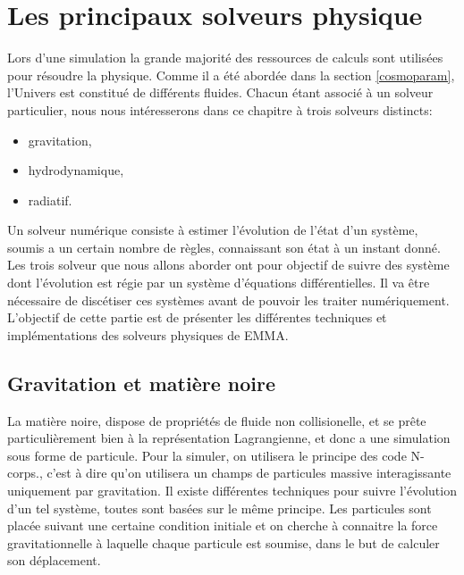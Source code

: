 \chapter{Les principaux solveurs physique}
\label{sec:solvers}

Lors d'une simulation la grande majorité des ressources de calculs sont utilisées pour résoudre la physique.
Comme il a été abordée dans la section \ref{cosmoparam}, l'Univers est constitué de différents fluides.
Chacun étant associé à un solveur particulier, nous nous intéresserons dans ce chapitre à trois solveurs distincts:
\begin{itemize}
\item gravitation,
\item hydrodynamique,
\item radiatif.
\end{itemize}



Un solveur numérique consiste à estimer l'évolution de l'état d'un système, soumis a un certain nombre de règles, connaissant son état à un instant donné.
Les trois solveur que nous allons aborder ont pour objectif de suivre des système dont l'évolution est régie par un système d'équations différentielles.
Il va être nécessaire de discétiser ces systèmes avant de pouvoir les traiter numériquement.
L'objectif de cette partie est de présenter les différentes techniques et implémentations des solveurs physiques de EMMA.

\section{Gravitation et matière noire}
\label{sec:solverDM}
La matière noire, dispose de propriétés de fluide non collisionelle, et se prête particulièrement bien à la représentation Lagrangienne, et donc a une simulation sous forme de particule.
Pour la simuler, on utilisera le principe des code N-corps., c'est à dire qu'on utilisera un champs de particules massive interagissante uniquement par gravitation.
Il existe différentes techniques pour suivre l'évolution d'un tel système, toutes sont basées sur le même principe.
Les particules sont placée suivant une certaine condition initiale et on cherche à connaitre la force gravitationnelle à laquelle chaque particule est soumise, dans le but de calculer son déplacement.

